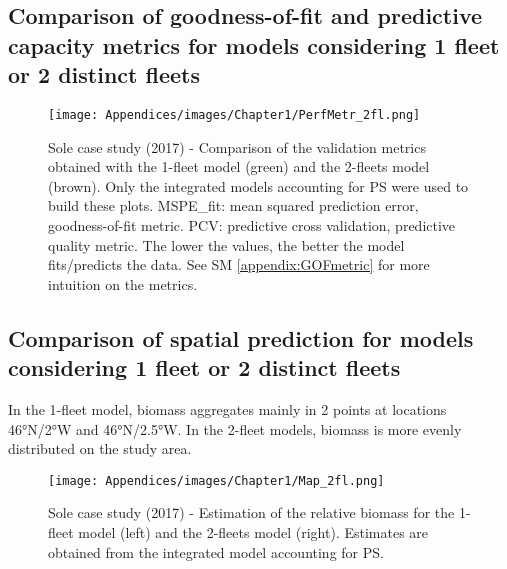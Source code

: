 \newpage

\subsection{Comparison of goodness-of-fit and predictive capacity metrics for models considering 1 fleet or 2 distinct fleets }\label{appendix:PerfMetr_2fl}

\begin{figure}[H]
   \begin{center}
      \texttt{[image: Appendices/images/Chapter1/PerfMetr\_2fl.png]}
   \end{center}
   \caption[Sole case study (2017) - Comparison of the validation metrics obtained with the 1-fleet model and the 2-fleets model.]
   {Sole case study (2017) - Comparison of the validation metrics obtained with the 1-fleet model (green) and the 2-fleets model (brown). Only the integrated models accounting for PS were used to build these plots. MSPE_fit: mean squared prediction error, goodness-of-fit metric. PCV: predictive cross validation, predictive quality metric. The lower the values, the better the model fits/predicts the data. See SM \ref{appendix:GOFmetric} for more intuition on the metrics.}
   \label{fig:PerfMetr_2fl}
\end{figure}

\newpage

\subsection{Comparison of spatial prediction for models considering 1 fleet or 2 distinct fleets}\label{appendix:Map_2fl}

In the 1-fleet model, biomass aggregates mainly in 2 points at locations 46°N/2°W and 46°N/2.5°W. In the 2-fleet models, biomass is more evenly distributed on the study area.

\begin{figure}[H]
   \begin{center}
      \texttt{[image: Appendices/images/Chapter1/Map\_2fl.png]}
   \end{center}
   \caption[Sole case study (2017) - Estimation of the relative biomass for the 1-fleet model and the 2-fleets model.]
   {Sole case study (2017) - Estimation of the relative biomass for the 1-fleet model (left) and the 2-fleets model (right). Estimates are obtained from the integrated model accounting for PS.}
   \label{fig:Map_2fl}
\end{figure}

